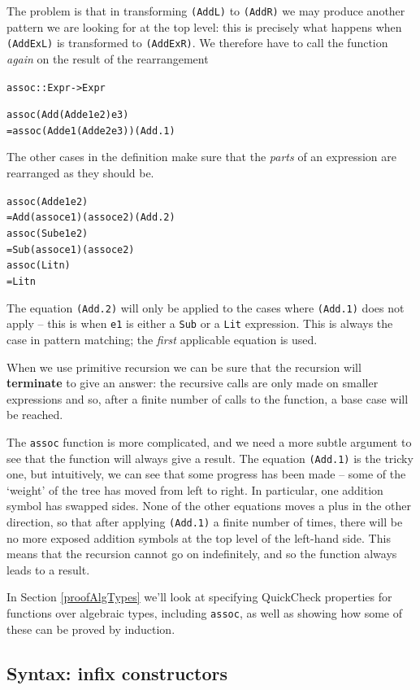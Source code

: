 \noindent
The problem is that
in transforming \texttt{(AddL)} to \texttt{(AddR)} we may produce another pattern we are
looking for at the top level: this is precisely what happens when \texttt{(AddExL)}
is transformed to \texttt{(AddExR)}. We therefore have to call the function {\em again\/} on the
result of the rearrangement
\begin{alltt}
assoc :: Expr -> Expr

assoc (Add (Add e1 e2) e3)
  = assoc (Add e1 (Add e2 e3)) \hfill (Add.1)
\end{alltt}
The other cases in the definition make sure that the {\em parts\/} of an
expression are rearranged as they should be.
\begin{alltt}
assoc (Add e1 e2) 
  = Add (assoc e1) (assoc e2) \hfill (Add.2)
assoc (Sub e1 e2) 
  = Sub (assoc e1) (assoc e2)
assoc (Lit n) 
  = Lit n
\end{alltt}
The equation \texttt{(Add.2)} will only be applied to the cases where \texttt{(Add.1)} does
not apply -- this is when \texttt{e1} is either a \texttt{Sub} or a \texttt{Lit}
expression. This is always the case in pattern matching; the {\em first\/}
applicable equation is used.

When we use primitive recursion we can be sure that the recursion will {\bf
terminate}
to give an answer: the  recursive calls are only made on smaller
expressions and so, after a finite number of calls to the function, a base
case will be reached. 

The \texttt{assoc} function is more complicated, and we
need a more subtle argument to see that the function will always give a
result. The equation \texttt{(Add.1)} is the tricky one, but intuitively, we can see
that some progress has been made -- some of the `weight' of the tree has moved
from left to right. In particular, one addition symbol has swapped sides.
None of the other equations moves a plus in the other direction, so
that after applying \texttt{(Add.1)} a finite number of times, there will be no more
exposed addition symbols at the top level of the left-hand side. This means
that the recursion cannot go on indefinitely, and so the function always
leads to a result.

In Section \ref{proofAlgTypes} we'll look at specifying QuickCheck properties for functions over algebraic types, including \texttt{assoc}, as well as showing how some of these can be proved by induction.

\subsection*{Syntax: infix constructors}

